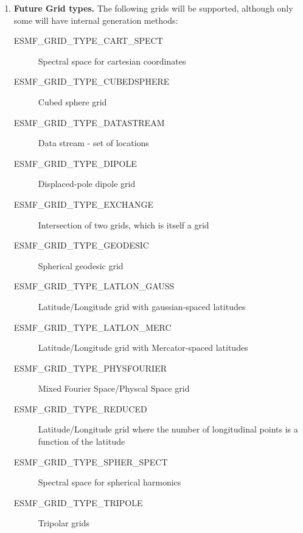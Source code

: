 \begin{enumerate}
\item {\bf Future Grid types.}  The following grids will
be supported, although only some will have internal generation 
methods:
 \begin{description}
    \item [ESMF\_GRID\_TYPE\_CART\_SPECT]
          Spectral space for cartesian coordinates
    \item [ESMF\_GRID\_TYPE\_CUBEDSPHERE]
          Cubed sphere grid
    \item [ESMF\_GRID\_TYPE\_DATASTREAM]
          Data stream - set of locations
    \item [ESMF\_GRID\_TYPE\_DIPOLE]
          Displaced-pole dipole grid
    \item [ESMF\_GRID\_TYPE\_EXCHANGE]
          Intersection of two grids, which is itself a grid
    \item [ESMF\_GRID\_TYPE\_GEODESIC]
          Spherical geodesic grid
    \item [ESMF\_GRID\_TYPE\_LATLON\_GAUSS]
          Latitude/Longitude grid with gaussian-spaced latitudes
    \item [ESMF\_GRID\_TYPE\_LATLON\_MERC]
          Latitude/Longitude grid with Mercator-spaced latitudes
    \item [ESMF\_GRID\_TYPE\_PHYSFOURIER]
          Mixed Fourier Space/Physcal Space grid
    \item [ESMF\_GRID\_TYPE\_REDUCED]
          Latitude/Longitude grid where the number of longitudinal points is a
          function of the latitude
    \item [ESMF\_GRID\_TYPE\_SPHER\_SPECT]
          Spectral space for spherical harmonics
    \item [ESMF\_GRID\_TYPE\_TRIPOLE]
          Tripolar grids
 \end{description}


\end{enumerate}
